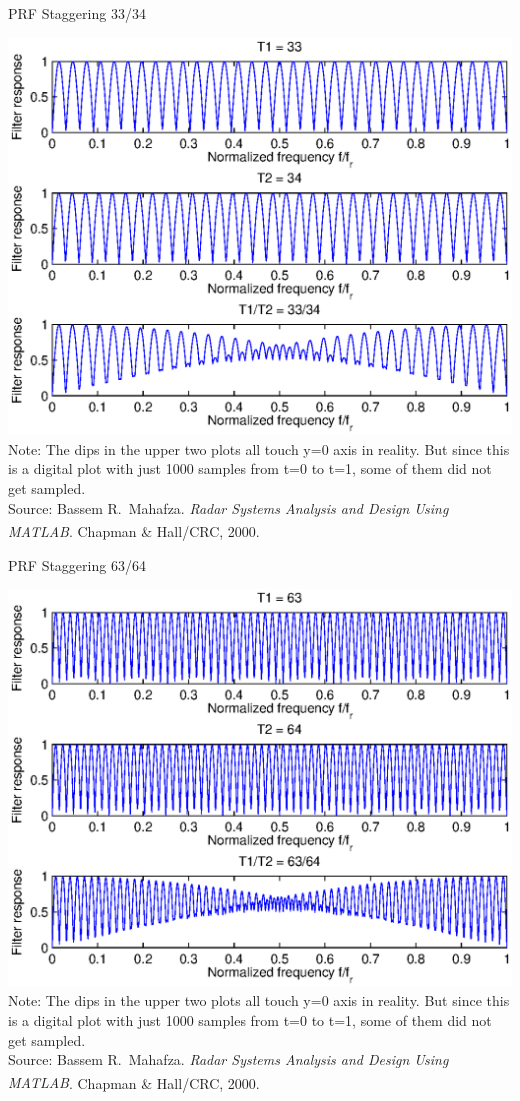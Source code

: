 \documentclass[mathserif]{beamer}
\begin{document}
    
    \begin{frame}{PRF Staggering 33/34}
      \begin{minipage}[t][0.8\textheight][t]{\textwidth}
	\centering
	\includegraphics[width=0.7\linewidth]{prfStaggering33_34} \\
	\vfill
	\tiny{Note: The dips in the upper two plots all touch y=0 axis in reality. But since this is a digital plot with just 1000 samples from t=0 to t=1, some of them did not get sampled.} \\
	\tiny{Source: Bassem R.~Mahafza. \emph{Radar Systems Analysis and Design Using MATLAB\textsuperscript{\textregistered}}. Chapman \& Hall/CRC, 2000.}
      \end{minipage}
    \end{frame}
    
   
    \begin{frame}{PRF Staggering 63/64}
      \begin{minipage}[t][0.8\textheight][t]{\textwidth}
	\centering
	\includegraphics[width=0.7\linewidth]{prfStaggering63_64} \\
	\vfill
	\tiny{Note: The dips in the upper two plots all touch y=0 axis in reality. But since this is a digital plot with just 1000 samples from t=0 to t=1, some of them did not get sampled.} \\
	\tiny{Source: Bassem R.~Mahafza. \emph{Radar Systems Analysis and Design Using MATLAB\textsuperscript{\textregistered}}. Chapman \& Hall/CRC, 2000.}
      \end{minipage}
    \end{frame}
    
\end{document}
